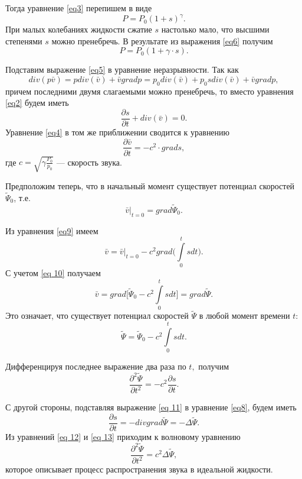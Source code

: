 Тогда уравнение \eqref{eq3} перепишем в виде
\begin{equation}\label{eq6}
P=P_0(1+s)^\gamma.
\end{equation}
При малых колебаниях жидкости сжатие $s$ настолько мало, что высшими степенями $s$ можно пренебречь. В результате из выражения \eqref{eq6} получим
\begin{equation}\label{eq7}
P=P_0(1+\gamma \cdot s).
\end{equation}

Подставим выражение \eqref{eq5} в уравнение неразрывности. Так как 
$$
 div(p \bar{v})= p div(\bar{v})+\bar{v}  grad p = p_0  div(\bar{v}) + p_0 s  div(\bar{v}) + \bar{v}  grad p,
$$
причем последними двумя слагаемыми можно пренебречь, то вместо уравнения \eqref{eq2} будем иметь
\begin{equation}\label{eq8}
\frac{\partial s}{\partial t} +  div (\bar{v}) = 0.
\end{equation}
Уравнение \eqref{eq4} в том же приближении сводится к уравнению
\begin{equation}\label{eq9}
\frac{\partial \bar{v}}{\partial t} = -c^2\cdot grad s,
\end{equation}
где $c=\sqrt{\gamma \frac{P_0}{p_0}}$ --- скорость звука.

Предположим теперь, что в начальный момент существует потенциал скоростей $\tilde\Psi_0$, т.е.
\begin{equation}\label{eq 10}
\bar{v}\big|_{t=0}= grad\tilde\Psi_0.
\end{equation}

Из уравнения \eqref{eq9} имеем
$$
\bar{v}=\bar{v}\big|_{t=0}-c^2 grad \bigg(\int\limits_{0}^{t} s d \! t\bigg).
$$
С учетом \eqref{eq 10} получаем
\begin{equation}\label{eq 11}
\bar{v}= grad\bigg[\tilde\Psi_0-c^2\int\limits_{0}^{t} s d \! t\bigg]= grad\tilde\Psi.
\end{equation}
Это означает, что существует потенциал скоростей $\tilde\Psi$ в любой момент времени $t:$
$$
\tilde\Psi=\tilde\Psi_0-c^2\int\limits_{0}^{t} s d \! t.
$$

Дифференцируя последнее выражение два раза по $t,$ получим
\begin{equation}\label{eq 12}
\frac{\partial^2\tilde\Psi}{\partial t^2}=-c^2\frac{\partial s}{\partial t}.
\end{equation}

С другой стороны, подставляя выражение \eqref{eq 11} в уравнение \eqref{eq8}, будем иметь
\begin{equation}\label{eq 13}
\frac{\partial s}{\partial t}=- div grad\tilde\Psi=-\Delta\tilde\Psi.
\end{equation}
Из уравнений \eqref{eq 12} и \eqref{eq 13} приходим к волновому уравнению
\begin{equation}\label{eq 14}
\frac{\partial^2\tilde\Psi}{\partial t^2}=c^2\Delta\tilde\Psi,
\end{equation}
которое описывает процесс распространения звука в идеальной жидкости.

